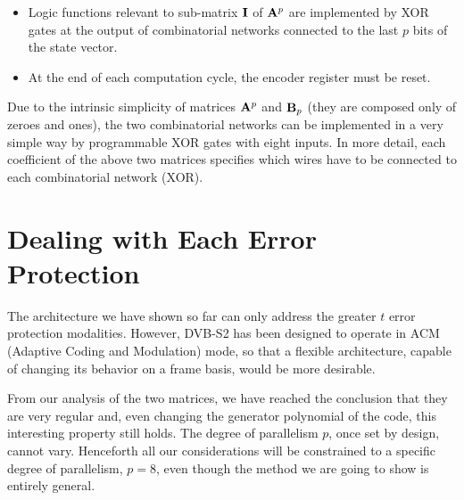 \begin{itemize}
\begin{enumerate}
\begin{equation}
        \right)
        \end{equation}
     \item 	row by column product involving (starting from bit \(x_8\) of vector \(\vet x\) which corresponds to row 9 of matrix \(\vet A^p\)) first \(n-k-p\) bits of vector \(\vet x\) is realized by sum modulo 2 (i.e., XOR gates) nodes on the right of the combinatorial networks.  gives a schematic representation of this combinatorial networks together with modulo 2 sum nodes.
     \end{enumerate}
\item Logic functions relevant to sub-matrix \(\mathbf{I}\) of \(\vet A^p\) are implemented by XOR gates at the output of combinatorial networks connected to the last \(p\) bits of the state vector.
\item At the end of each computation cycle, the encoder register must be reset.
\end{itemize}

Due to the intrinsic simplicity of matrices \(\vet A^p\) and \(\mathbf{B}_p\) (they are composed only of zeroes and ones), the two combinatorial networks can be implemented in a very simple way by programmable XOR gates with eight inputs.
In more detail, each coefficient of the above two matrices specifies which wires have to be connected to each combinatorial network (XOR).



\section{Dealing with Each Error Protection}

The architecture we have shown so far can only address the greater \(t\) error protection modalities. However, DVB-S2 has been designed to operate in ACM (Adaptive Coding and Modulation) mode, so that a flexible architecture, capable of changing its behavior on a frame basis, would be more desirable.

From our analysis of the two matrices, we have reached the conclusion that they are very regular and, even changing the generator polynomial of the code, this interesting property still holds. The degree of parallelism \(p\), once set by design, cannot vary. Henceforth all our considerations will be constrained to a specific degree of parallelism, \(p=8\), even though the method we are going to show is entirely general.

